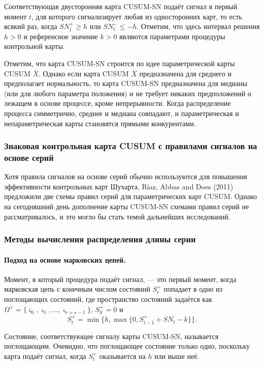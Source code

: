 Соответствующая двусторонняя карта CUSUM-SN подаёт сигнал в первый момент \(t\), для которого сигнализирует любая из односторонних карт, то есть всякий раз, когда \(SN_t^+ \ge h\) или \(SN_t^- \le -h\). Отметим, что здесь интервал решения \(h > 0\) и референсное значение \(k > 0\) являются параметрами процедуры контрольной карты.

Отметим, что карта CUSUM-SN строится по идее параметрической карты CUSUM \(\overline{X}\). Однако если карта CUSUM \(\overline{X}\) предназначена для среднего и предполагает нормальность, то карта CUSUM-SN предназначена для медианы (или для любого параметра положения) и не требует никаких предположений о лежащем в основе процессе, кроме непрерывности. Когда распределение процесса симметрично, среднее и медиана совпадают, и параметрическая и непараметрическая карты становятся прямыми конкурентами.

\subsubsection{Знаковая контрольная карта CUSUM с правилами сигналов на основе серий}
Хотя правила сигналов на основе серий обычно используются для повышения эффективности контрольных карт Шухарта, Riaz, Abbas and Does (2011) предложили две схемы правил серий для параметрических карт CUSUM. Однако на сегодняшний день дополнение карты CUSUM-SN схемами правил серий не рассматривалось, и это могло бы стать темой дальнейших исследований.

\subsubsection{Методы вычисления распределения длины серии}
\paragraph{Подход на основе марковских цепей.} Момент, в который процедура подаёт сигнал, --- это первый момент, когда марковская цепь с конечным числом состояний \(S_t^+\) попадает в одно из поглощающих состояний, где пространство состояний задаётся как \(\Omega^+ = \{\varsigma_0, \varsigma_1, \ldots, \varsigma_{r+s-1}\}\), \(S_0^+ = 0\) и
\begin{equation}
	S_t^+ = \min\{h, \max\{0, S_{t-1}^+ + SN_t - k\}\}.
	\label{eq:4.9}
\end{equation}

Состояние, соответствующее сигналу карты CUSUM-SN, называется поглощающим. Очевидно, что поглощающее состояние только одно, поскольку карта подаёт сигнал, когда \(S_t^+\) оказывается на \(h\) или выше неё.

